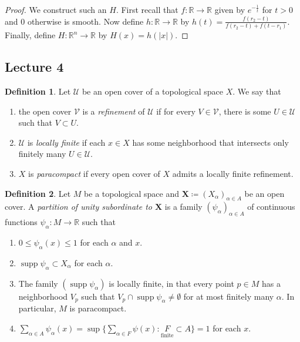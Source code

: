 \documentclass[10pt,letterpaper,cm]{nupset}
\theoremstyle{definition}
\newtheorem*{definition}{Definition}
\newcommand{\R}{\mathbb R}
\newcommand{\X}{\mathbf X}
\newcommand{\1}{\mathbf{1}}
\newcommand{\0}{\vec 0}
\DeclareMathOperator{\supp}{supp}
\begin{document}
\begin{proof}
We construct such an $H$. First recall that $f: \R \to \R$ given by $e^{-\frac{1}{t}}$ for $t>0$ and $0$ otherwise is smooth. Now define $h: \R \to \R$ by $h(t) = \frac{f(r_2-t)}{f(r_2-t)+ f(t-r_1)}$. Finally, define $H: \R^n \to \R$ by $H(x) = h(|x|)$.
\end{proof}

\subsection{Lecture 4}

\begin{definition}
Let $\mathcal{U}$ be an open cover of a topological space $X$. We say that 
\begin{enumerate}
\item the open cover $\mathcal{V}$ is a \textit{refinement} of $\mathcal{U}$ if for every $V\in \mathcal{V}$, there is some $U \in \mathcal{U}$ such that $V \subset U$.
\item $\mathcal{U}$ is \textit{locally finite} if each $x\in X$ has some neighborhood that intersects only finitely many $U \in \mathcal{U}$. 
\item $X$ is \textit{paracompact} if every open cover of $X$ admits a locally finite refinement.
\end{enumerate}
\end{definition}

\begin{definition} Let $M$ be a topological space and $\X\coloneqq (X_\alpha)_{\alpha \in A}$ be an open cover. A \textit{partition of unity subordinate to $\X$} is a family $(\psi_\alpha)_{\alpha \in A}$ of continuous functions $\psi_\alpha : M \to \R$ such that
\begin{enumerate}
\item $0\leq \psi_\alpha(x) \leq 1$ for each $\alpha$ and $x$.
\item $\supp \psi_\alpha \subset X_\alpha$ for each $\alpha$.
\item The family $(\supp \psi_\alpha)$ is locally finite, in that every point $p\in M$ has a neighborhood $V_p$ such that $V_p \cap \supp \psi_\alpha \ne \emptyset$ for at most finitely many $\alpha$. In particular, $M$ is paracompact.
\item $\sum_{\alpha \in A} \psi_\alpha(x) = \sup\{\sum_{\alpha \in F}\psi(x) : \underset{\text{finite}} F \subset A\} = 1$ for each $x$.
\end{enumerate}
\end{definition}
\end{document}
